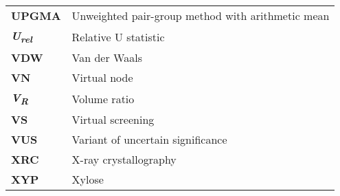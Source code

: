 \begin{longtable}[l]{@{}p{2.5cm}p{12cm}@{}}
\textbf{UPGMA} & Unweighted pair-group method with arithmetic mean \\
\textbf{\textit{U\textsubscript{rel}}} & Relative U statistic \\
\textbf{VDW} & Van der Waals \\
\textbf{VN} & Virtual node \\
\textbf{\textit{V\textsubscript{R}}} & Volume ratio \\
\textbf{VS} & Virtual screening \\
\textbf{VUS} & Variant of uncertain significance \\
\textbf{XRC} & X-ray crystallography \\
\textbf{XYP} & Xylose \\

\end{longtable}
